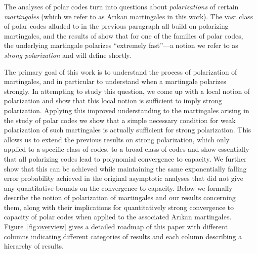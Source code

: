 \documentclass[11pt]{article}
\begin{document}
The analyses of polar codes turn into questions about {\em polarizations} of certain {\em martingales} (which we refer to as Ar\i kan martingales in this work). The vast class of polar codes alluded to in the previous paragraph all build on polarizing martingales, and the results of  \cite{GX15,HAU14,GV15} show that for one of the families of polar codes, the underlying martingale polarizes ``extremely fast''---a notion we refer to as {\em strong polarization} and will define shortly.

The primary goal of this work is to understand the process of
polarization of martingales, and in particular to understand when a
martingale polarizes strongly. In attempting to study this question,
we come up with a local notion of polarization and show that this
local notion is sufficient to imply strong polarization. Applying this
improved understanding to the martingales arising in the study of
polar codes we show that a simple necessary condition for weak
polarization of such martingales is actually sufficient for strong
polarization. This allows us to extend the previous results on strong
polarization, which only applied to a specific class of codes, to a
broad class of codes and show essentially that all polarizing codes
lead to polynomial convergence to capacity. We further show that this can be achieved while maintaining the same exponentially falling error probability achieved in the original asymptotic analyses that did not give any quantitative bounds on the convergence to capacity. Below we formally describe
the notion of polarization of martingales and our results concerning them, along with their implications for quantitatively strong convergence to capacity of polar codes when applied to the associated Ar\i kan martingales.
Figure~\ref{fig:overview} gives a detailed roadmap of this paper with different columns indicating different categories of results and each column describing a hierarchy of results.





\end{document}
